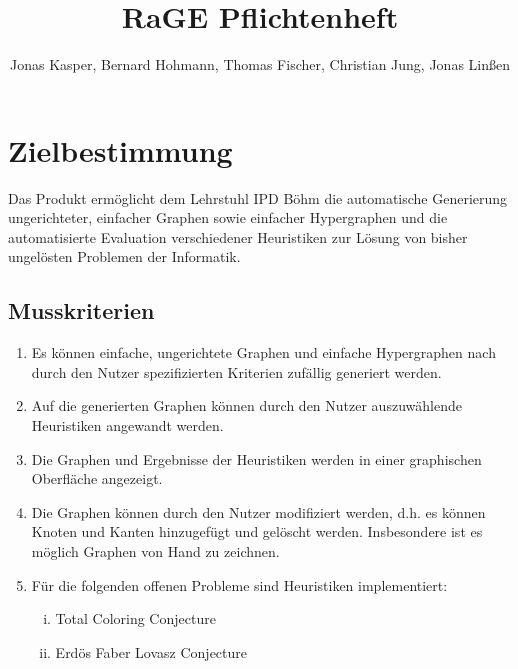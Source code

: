 \documentclass{article}
\title{RaGE Pflichtenheft}
\author{Jonas Kasper, Bernard Hohmann, Thomas Fischer, Christian Jung, Jonas Linßen}
\begin{document}
	\maketitle
	
	
	\newpage
	
	\tableofcontents
	
	\newpage
	
	
	\section{Zielbestimmung}
	Das Produkt ermöglicht dem Lehrstuhl IPD Böhm die automatische Generierung ungerichteter, einfacher Graphen sowie einfacher Hypergraphen und die automatisierte Evaluation verschiedener Heuristiken zur Lösung von bisher ungelösten Problemen der Informatik.
	
	\subsection{Musskriterien}
	\begin{enumerate}[(M1)]
		\item{Es können einfache, ungerichtete Graphen und einfache Hypergraphen nach durch den Nutzer spezifizierten Kriterien zufällig generiert werden.}
		\item{Auf die generierten Graphen können durch den Nutzer auszuwählende Heuristiken angewandt werden.}
		\item{Die Graphen und Ergebnisse der Heuristiken werden in einer graphischen Oberfläche angezeigt.}
		\item{Die Graphen können durch den Nutzer modifiziert werden, d.h. es können Knoten und Kanten hinzugefügt und gelöscht werden. Insbesondere ist es möglich Graphen von Hand zu zeichnen.}
		\item{Für die folgenden offenen Probleme sind Heuristiken implementiert:
			\begin{enumerate}[i)]
				\item{Total Coloring Conjecture}
				\item{Erdös Faber Lovasz Conjecture}
			\end{enumerate}
		}
	\end{enumerate}
	
\end{document}
